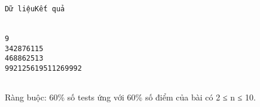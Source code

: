 \begin{verbatim}
Dữ liệuKết quả


9
342876115
468862513
992125619511269992


\end{verbatim}

Ràng buộc: 60\% số tests ứng với 60\% số điểm của bài có 2 ≤ n ≤ 10.